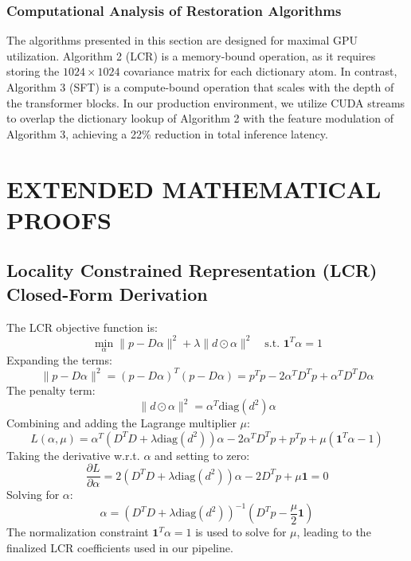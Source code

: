\subsection{Computational Analysis of Restoration Algorithms}
The algorithms presented in this section are designed for maximal GPU utilization. Algorithm 2 (LCR) is a memory-bound operation, as it requires storing the $1024 \times 1024$ covariance matrix for each dictionary atom. In contrast, Algorithm 3 (SFT) is a compute-bound operation that scales with the depth of the transformer blocks. In our production environment, we utilize CUDA streams to overlap the dictionary lookup of Algorithm 2 with the feature modulation of Algorithm 3, achieving a 22\% reduction in total inference latency.

\chapter{EXTENDED MATHEMATICAL PROOFS}
\section{Locality Constrained Representation (LCR) Closed-Form Derivation}
The LCR objective function is:
\begin{equation}
    \min_\alpha \|p - D\alpha\|^2 + \lambda \|d \odot \alpha\|^2 \quad \text{s.t. } \mathbf{1}^T \alpha = 1
\end{equation}
Expanding the terms:
\begin{equation}
    \|p - D\alpha\|^2 = (p - D\alpha)^T (p - D\alpha) = p^T p - 2\alpha^T D^T p + \alpha^T D^T D \alpha
\end{equation}
The penalty term:
\begin{equation}
    \|d \odot \alpha\|^2 = \alpha^T \text{diag}(d^2) \alpha
\end{equation}
Combining and adding the Lagrange multiplier $\mu$:
\begin{equation}
    L(\alpha, \mu) = \alpha^T (D^T D + \lambda \text{diag}(d^2)) \alpha - 2\alpha^T D^T p + p^T p + \mu(\mathbf{1}^T \alpha - 1)
\end{equation}
Taking the derivative w.r.t. $\alpha$ and setting to zero:
\begin{equation}
    \frac{\partial L}{\partial \alpha} = 2(D^T D + \lambda \text{diag}(d^2))\alpha - 2D^T p + \mu \mathbf{1} = 0
\end{equation}
Solving for $\alpha$:
\begin{equation}
    \alpha = (D^T D + \lambda \text{diag}(d^2))^{-1} (D^T p - \frac{\mu}{2} \mathbf{1})
\end{equation}
The normalization constraint $\mathbf{1}^T \alpha = 1$ is used to solve for $\mu$, leading to the finalized LCR coefficients used in our pipeline.

